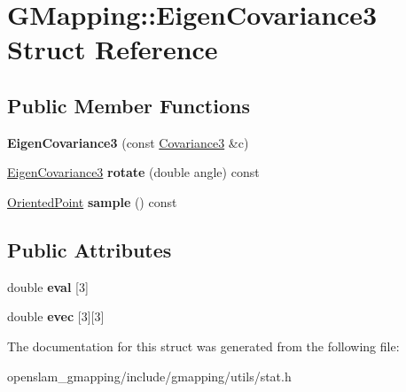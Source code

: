 \hypertarget{structGMapping_1_1EigenCovariance3}{}\section{G\+Mapping\+:\+:Eigen\+Covariance3 Struct Reference}
\label{structGMapping_1_1EigenCovariance3}
\subsection*{Public Member Functions}
\begin{DoxyCompactItemize}
\item 
\mbox{\label{structGMapping_1_1EigenCovariance3_a382fc4f9890ddb4d5f0b457c60188c21}} 
{\bfseries Eigen\+Covariance3} (const \hyperlink{structGMapping_1_1Covariance3}{Covariance3} \&c)
\item 
\mbox{\label{structGMapping_1_1EigenCovariance3_a07bab62ae744d94974144f3b28bd768a}} 
\hyperlink{structGMapping_1_1EigenCovariance3}{Eigen\+Covariance3} {\bfseries rotate} (double angle) const
\item 
\mbox{\label{structGMapping_1_1EigenCovariance3_ac607d09cfd8a3445928e8db50df56ffa}} 
\hyperlink{structGMapping_1_1orientedpoint}{Oriented\+Point} {\bfseries sample} () const
\end{DoxyCompactItemize}
\subsection*{Public Attributes}
\begin{DoxyCompactItemize}
\item 
\mbox{\label{structGMapping_1_1EigenCovariance3_a6bda6c153a521484a61194c8c563f343}} 
double {\bfseries eval} \mbox{[}3\mbox{]}
\item 
\mbox{\label{structGMapping_1_1EigenCovariance3_aa1f7cda37a444b94987b12dce284e830}} 
double {\bfseries evec} \mbox{[}3\mbox{]}\mbox{[}3\mbox{]}
\end{DoxyCompactItemize}


The documentation for this struct was generated from the following file\+:\begin{DoxyCompactItemize}
\item 
openslam\+\_\+gmapping/include/gmapping/utils/stat.\+h\end{DoxyCompactItemize}

